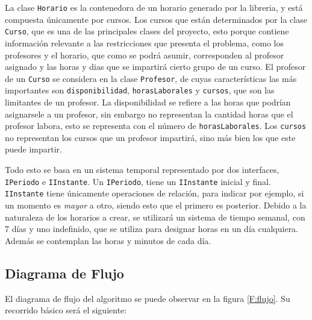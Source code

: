 \documentclass[paper=letter, fontsize=12pt]{article}
\begin{document}
La clase \texttt{Horario} es la contenedora de un horario generado por la
libreria, y está compuesta únicamente por cursos. Los cursos que están
determinados por la clase \texttt{Curso}, que es una de las principales clases
del proyecto, esto porque contiene información relevante a las restricciones que
presenta el problema, como los profesores y el horario, que como se podrá
asumir, corresponden al profesor asignado y las horas y dias que se impartirá
cierto grupo de un curso. El profesor de un \texttt{Curso} se considera en la
clase \texttt{Profesor}, de cuyas características las más importantes son
\texttt{disponibilidad}, \texttt{horasLaborales} y \texttt{cursos}, que son las
limitantes de un profesor. La disponibilidad se refiere a las horas que podrían
asignarsele a un profesor, sin embargo no representan la cantidad horas que el
profesor labora, esto se representa con el número de \texttt{horasLaborales}.
Los \texttt{cursos} no representan los cursos que un profesor impartirá, sino
más bien los que este puede impartir.

Todo esto se basa en un sistema temporal representado por dos interfaces,
\texttt{IPeriodo} e \texttt{IInstante}. Un \texttt{IPeriodo}, tiene un
\texttt{IInstante} inicial y final. \texttt{IInstante} tiene únicamente
operaciones de relación, para indicar por ejemplo, si un momento es
\textit{mayor} a otro, siendo esto que el primero es posterior.
Debido a la naturaleza de los horarios a crear, se utilizará un sistema
de tiempo semanal, con 7 días  y uno indefinido, que se utiliza para designar
horas en un día cualquiera. Además se contemplan las horas y minutos de cada
día.

\subsection{Diagrama de Flujo}
El diagrama de flujo del algoritmo se puede observar en la figura \ref{F:flujo}.
Su recorrido básico será el siguiente:
\end{document}
